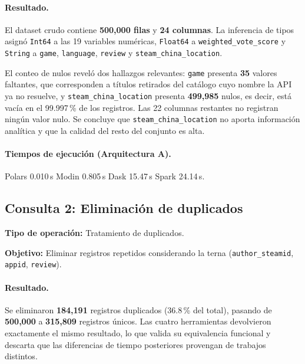 \paragraph{Resultado.}
El dataset crudo contiene \textbf{500,000 filas} y \textbf{24 columnas}. La inferencia de tipos asignó \texttt{Int64} a las 19 variables numéricas, \texttt{Float64} a \texttt{weighted\_vote\_score} y \texttt{String} a \texttt{game}, \texttt{language}, \texttt{review} y \texttt{steam\_\bk{}china\_\bk{}location}.

El conteo de nulos reveló dos hallazgos relevantes: \texttt{game} presenta \textbf{35} valores faltantes, que corresponden a títulos retirados del catálogo cuyo nombre la API ya no resuelve, y \texttt{steam\_\bk{}china\_\bk{}location} presenta \textbf{499,985} nulos, es decir, está vacía en el 99.997\,\% de los registros. Las 22 columnas restantes no registran ningún valor nulo. Se concluye que \texttt{steam\_\bk{}china\_\bk{}location} no aporta información analítica y que la calidad del resto del conjunto es alta.

\paragraph{Tiempos de ejecución (Arquitectura A).}
Polars 0.010\,s \textbar{} Modin 0.805\,s \textbar{} Dask 15.47\,s \textbar{} Spark 24.14\,s.



\subsection{Consulta 2: Eliminación de duplicados}

\textbf{Tipo de operación:} Tratamiento de duplicados.

\textbf{Objetivo:} Eliminar registros repetidos considerando la terna (\texttt{author\_steamid}, \texttt{appid}, \texttt{review}).


\paragraph{Resultado.}
Se eliminaron \textbf{184,191} registros duplicados (36.8\,\% del total), pasando de \textbf{500,000} a \textbf{315,809} registros únicos. Las cuatro herramientas devolvieron exactamente el mismo resultado, lo que valida su equivalencia funcional y descarta que las diferencias de tiempo posteriores provengan de trabajos distintos.

